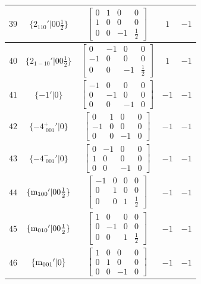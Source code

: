 \documentclass[fleqn,8pt]{jsarticle}
\begin{document}
\begin{longtable}{ccccc}
$ 39 $ & $ \{2{}_{110}{}'|0 0 \frac{1}{2}\} $ & $ \begin{bmatrix} 0 & 1 & 0 & 0 \\ 1 & 0 & 0 & 0 \\ 0 & 0 & -1 & \frac{1}{2} \end{bmatrix} $ & $ 1 $ & $ -1 $ \\ \hline
$ 40 $ & $ \{2{}_{1-10}{}'|0 0 \frac{1}{2}\} $ & $ \begin{bmatrix} 0 & -1 & 0 & 0 \\ -1 & 0 & 0 & 0 \\ 0 & 0 & -1 & \frac{1}{2} \end{bmatrix} $ & $ 1 $ & $ -1 $ \\ \hline
$ 41 $ & $ \{-1{}'|0\} $ & $ \begin{bmatrix} -1 & 0 & 0 & 0 \\ 0 & -1 & 0 & 0 \\ 0 & 0 & -1 & 0 \end{bmatrix} $ & $ -1 $ & $ -1 $ \\ \hline
$ 42 $ & $ \{-4^{+}_{\,\,001}{}'|0\} $ & $ \begin{bmatrix} 0 & 1 & 0 & 0 \\ -1 & 0 & 0 & 0 \\ 0 & 0 & -1 & 0 \end{bmatrix} $ & $ -1 $ & $ -1 $ \\ \hline
$ 43 $ & $ \{-4^{-}_{\,\,001}{}'|0\} $ & $ \begin{bmatrix} 0 & -1 & 0 & 0 \\ 1 & 0 & 0 & 0 \\ 0 & 0 & -1 & 0 \end{bmatrix} $ & $ -1 $ & $ -1 $ \\ \hline
$ 44 $ & $ \{{\rm m}_{100}{}'|0 0 \frac{1}{2}\} $ & $ \begin{bmatrix} -1 & 0 & 0 & 0 \\ 0 & 1 & 0 & 0 \\ 0 & 0 & 1 & \frac{1}{2} \end{bmatrix} $ & $ -1 $ & $ -1 $ \\ \hline
$ 45 $ & $ \{{\rm m}_{010}{}'|0 0 \frac{1}{2}\} $ & $ \begin{bmatrix} 1 & 0 & 0 & 0 \\ 0 & -1 & 0 & 0 \\ 0 & 0 & 1 & \frac{1}{2} \end{bmatrix} $ & $ -1 $ & $ -1 $ \\ \hline
$ 46 $ & $ \{{\rm m}_{001}{}'|0\} $ & $ \begin{bmatrix} 1 & 0 & 0 & 0 \\ 0 & 1 & 0 & 0 \\ 0 & 0 & -1 & 0 \end{bmatrix} $ & $ -1 $ & $ -1 $ \\ \hline

\end{longtable}
\end{document}
